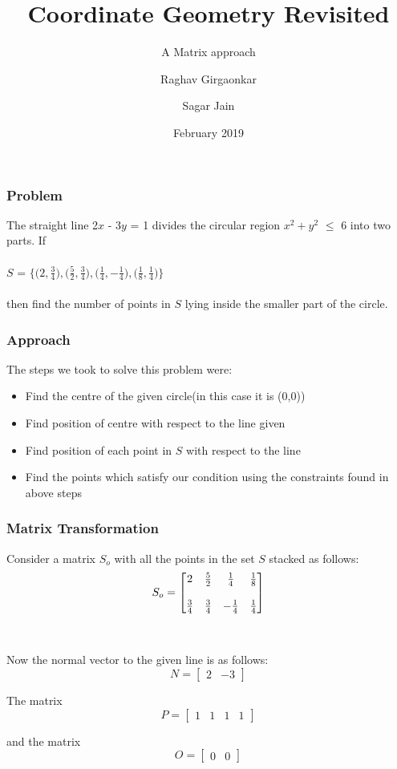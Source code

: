 \documentclass{beamer}
\title{Coordinate Geometry Revisited}
\subtitle{A Matrix approach}
\author{Raghav Girgaonkar \and Sagar Jain}
\institute{Indian Institute of Technology Hyderabad}
\date{February 2019}
\begin{document}
 
\frame{\titlepage}
 
\begin{frame}
\frametitle{Problem}
The straight line 2$x$ - 3$y$ = 1 divides the circular region $x^{2} + y^{2}$ $\leqslant$ 6 into two parts. If\\~\\
$S$ = $\Bigg \lbrace \bigg(2,$\(\frac{3}{4}\)$\bigg),\bigg($\(\frac{5}{2}\)$,$\(\frac{3}{4}\)$\bigg),\bigg($\(\frac{1}{4}\)$,$\(-\frac{1}{4}\)$\bigg),\bigg($\(\frac{1}{8}\)$,$\(\frac{1}{4}\)$\bigg)\Bigg\rbrace$
\\~\\
then find the number of points in $S$ lying inside the smaller part of the circle.
\end{frame}

\begin{frame}
\frametitle{Approach}
The steps we took to solve this problem were:
\begin{itemize}
 \item<1-> Find the centre of the given circle(in this case it is (0,0))
 \item<2-> Find position of centre with respect to the line given
 \item<3-> Find position of each point in $S$ with respect to the line
 \item<4-> Find the points which satisfy our condition using the constraints found in above steps
\end{itemize}

\end{frame}

\begin{frame}
\frametitle{Matrix Transformation}
Consider a matrix $S_o$ with all the points in the set $S$ stacked as follows: 
\[
 S_o =
\begin{bmatrix}
    2  & $\(\frac{5}{2}\)$ & $\(\frac{1}{4}\)$ & $\(\frac{1}{8}\)$ \\~\\
    $\(\frac{3}{4}\)$ & $\(\frac{3}{4}\)$ & $\(-\frac{1}{4}\)$ &$\(\frac{1}{4}\)$\\
    
\end{bmatrix}
\]
\\~\\
Now the normal vector to the given line is as follows:
\[
 N =
\begin{bmatrix}
    2  & -3
\end{bmatrix}
\]

The matrix
\[
 P =
\begin{bmatrix}
    1 & 1 & 1 & 1
\end{bmatrix}
\]

and the matrix
\[
 O =
\begin{bmatrix}
    0  & 0
\end{bmatrix}
\]
\end{frame}
\end{document}
